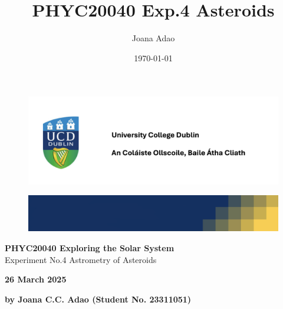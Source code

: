\documentclass[12pt]{article}
\title{PHYC20040 Exp.4 Asteroids}
\author{Joana Adao}
\date{\today}
\begin{document}
\begin{titlepage}
    \begin{center}

        \begin{figure}[ht]
            \includegraphics[width=\textwidth]{UCDLogo.png}
        \end{figure}
        
        \begin{figure}
            \centerline{\includegraphics[width=\paperwidth]{UCDBanner.png}}
        \end{figure}

        \vspace{4cm}

        {\LARGE \bfseries PHYC20040 Exploring the Solar System}\\
        \vspace{0.75cm}
        {\Large Experiment No.4 Astrometry of Asteroids}
        
        \vspace{1cm}
    
    {\Large \textbf{26 March 2025}}

    \vspace{2cm}
    
    {\large \textbf{by Joana C.C. Adao (Student No. 23311051)}}\\

    \end{center}

   \clearpage

\end{titlepage}

\tableofcontents
\thispagestyle{empty}

\newpage

\begin{abstract}
\thispagestyle{empty}



 
\end{abstract}
\newpage
\end{document}
